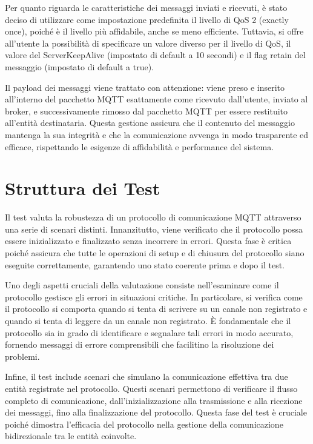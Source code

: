 \documentclass[12pt,a4paper,openright,twoside]{book}
\begin{document}
Per quanto riguarda le caratteristiche dei messaggi inviati e ricevuti, è stato deciso di utilizzare come impostazione predefinita il livello di \ac{QoS} 2 (exactly once), 
poiché è il livello più affidabile, anche se meno efficiente. Tuttavia, si offre all'utente la possibilità di specificare un valore diverso per il livello di \ac{QoS}, 
il valore del ServerKeepAlive (impostato di default a 10 secondi) e il flag retain del messaggio (impostato di default a true). 

Il payload dei messaggi viene trattato con attenzione: viene preso e inserito all'interno del pacchetto \ac{MQTT} esattamente come ricevuto dall'utente, inviato al broker, 
e successivamente rimosso dal pacchetto \ac{MQTT} per essere restituito all'entità destinataria. Questa gestione assicura che il contenuto del messaggio mantenga la sua 
integrità e che la comunicazione avvenga in modo trasparente ed efficace, rispettando le esigenze di affidabilità e performance del sistema.

\section{Struttura dei Test}

Il test valuta la robustezza di un protocollo di comunicazione MQTT attraverso una serie di scenari distinti. Innanzitutto, viene verificato che il protocollo possa essere 
inizializzato e finalizzato senza incorrere in errori. Questa fase è critica poiché assicura che tutte le operazioni di setup e di chiusura del protocollo siano eseguite 
correttamente, garantendo uno stato coerente prima e dopo il test.

Uno degli aspetti cruciali della valutazione consiste nell'esaminare come il protocollo gestisce gli errori in situazioni critiche. In particolare, si verifica come il protocollo 
si comporta quando si tenta di scrivere su un canale non registrato e quando si tenta di leggere da un canale non registrato. È fondamentale che il protocollo sia in grado di 
identificare e segnalare tali errori in modo accurato, fornendo messaggi di errore comprensibili che facilitino la risoluzione dei problemi.

Infine, il test include scenari che simulano la comunicazione effettiva tra due entità registrate nel protocollo. Questi scenari permettono di verificare il flusso completo 
di comunicazione, dall'inizializzazione alla trasmissione e alla ricezione dei messaggi, fino alla finalizzazione del protocollo. Questa fase del test è cruciale poiché dimostra 
l'efficacia del protocollo nella gestione della comunicazione bidirezionale tra le entità coinvolte.
\end{document}
